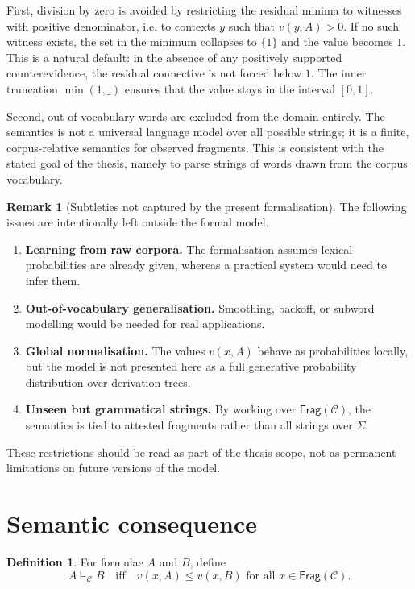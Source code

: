 \documentclass[12pt,a4paper]{report}
\theoremstyle{definition}
\newtheorem{definition}[theorem]{Definition}
\newtheorem{remark}[theorem]{Remark}
\newcommand{\Frag}{\mathsf{Frag}}
\newcommand{\Sem}{\models_{\mathcal C}}
\begin{document}
First, division by zero is avoided by restricting the residual minima to witnesses with positive
denominator, i.e. to contexts $y$ such that $v(y,A)>0$. If no such witness exists, the set in the
minimum collapses to $\{1\}$ and the value becomes $1$. This is a natural default: in the absence
of any positively supported counterevidence, the residual connective is not forced below $1$.
The inner truncation $\min(1,\_)$ ensures that the value stays in the interval $[0,1]$.

Second, out-of-vocabulary words are excluded from the domain entirely. The semantics is not a
universal language model over all possible strings; it is a finite, corpus-relative semantics for
observed fragments. This is consistent with the stated goal of the thesis, namely to parse strings
of words drawn from the corpus vocabulary.

\begin{remark}[Subtleties not captured by the present formalisation]
The following issues are intentionally left outside the formal model.
\begin{enumerate}[label=(\alph*)]
    \item \textbf{Learning from raw corpora.} The formalisation assumes lexical probabilities are
    already given, whereas a practical system would need to infer them.
    \item \textbf{Out-of-vocabulary generalisation.} Smoothing, backoff, or subword modelling would be
    needed for real applications.
    \item \textbf{Global normalisation.} The values $v(x,A)$ behave as probabilities locally, but the model is
    not presented here as a full generative probability distribution over derivation trees.
    \item \textbf{Unseen but grammatical strings.} By working over $\Frag(\mathcal C)$, the semantics is tied to
    attested fragments rather than all strings over $\Sigma$.
\end{enumerate}
These restrictions should be read as part of the thesis scope, not as permanent limitations on
future versions of the model.
\end{remark}

\section{Semantic consequence}
\begin{definition}
For formulae $A$ and $B$, define
\[
A \Sem B
\quad\text{iff}\quad
v(x,A) \leq v(x,B) \text{ for all } x \in \Frag(\mathcal C).
\]
\end{definition}
\end{document}
